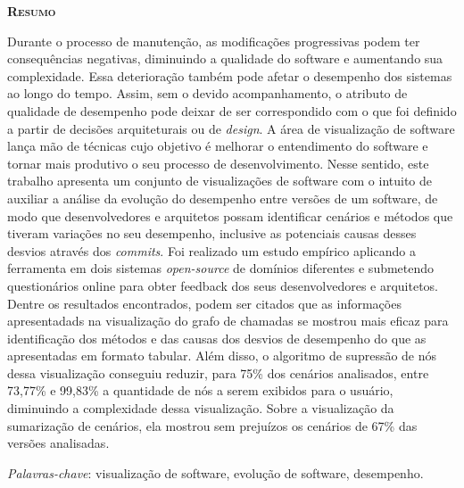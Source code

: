 \begin{center}
	{\Large{\textbf{\mscThesisTitle}}}
\end{center}

\vspace{1cm}


\vspace{1cm}

\begin{center}
	\Large{\textsc{\textbf{Resumo}}}
\end{center}

\noindent Durante o processo de manutenção, as modificações progressivas podem ter consequências negativas, diminuindo a qualidade do software e aumentando sua complexidade. Essa deterioração também pode afetar o desempenho dos sistemas ao longo do tempo. Assim, sem o devido acompanhamento, o atributo de qualidade de desempenho pode deixar de ser correspondido com o que foi definido a partir de decisões arquiteturais ou de \textit{design}. A área de visualização de software lança mão de técnicas cujo objetivo é melhorar o entendimento do software e tornar mais produtivo o seu processo de desenvolvimento. Nesse sentido, este trabalho apresenta um conjunto de visualizações de software com o intuito de auxiliar a análise da evolução do desempenho entre versões de um software, de modo que desenvolvedores e arquitetos possam identificar cenários e métodos que tiveram variações no seu desempenho, inclusive as potenciais causas desses desvios através dos \textit{commits}. Foi realizado um estudo empírico aplicando a ferramenta em dois sistemas \textit{open-source} de domínios diferentes e submetendo questionários online para obter feedback dos seus desenvolvedores e arquitetos. Dentre os resultados encontrados, podem ser citados que as informações apresentadads na visualização do grafo de chamadas se mostrou mais eficaz para identificação dos métodos e das causas dos desvios de desempenho do que as apresentadas em formato tabular. Além disso, o algoritmo de supressão de nós dessa visualização conseguiu reduzir, para 75\% dos cenários analisados, entre 73,77\% e 99,83\% a quantidade de nós a serem exibidos para o usuário, diminuindo a complexidade dessa visualização. Sobre a visualização da sumarização de cenários, ela mostrou sem prejuízos os cenários de 67\% das versões analisadas.

\noindent\textit{Palavras-chave}: visualização de software, evolução de software, desempenho.